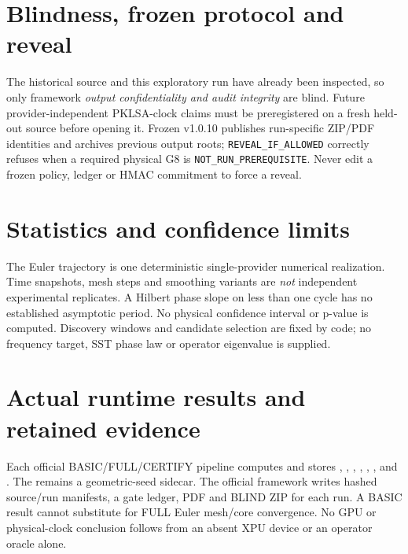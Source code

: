 \documentclass[11pt,a4paper]{article}
\begin{document}
\section{Blindness, frozen protocol and reveal}
The historical source and this exploratory run have already been inspected, so only framework \emph{output confidentiality and audit integrity} are blind. Future provider-independent PKLSA-clock claims must be preregistered on a fresh held-out source before opening it. Frozen v1.0.10 publishes run-specific ZIP/PDF identities and archives previous output roots; \texttt{REVEAL\_IF\_ALLOWED} correctly refuses when a required physical G8 is \texttt{NOT\_RUN\_PREREQUISITE}. Never edit a frozen policy, ledger or HMAC commitment to force a reveal.

\section{Statistics and confidence limits}
The Euler trajectory is one deterministic single-provider numerical realization. Time snapshots, mesh steps and smoothing variants are \emph{not} independent experimental replicates. A Hilbert phase slope on less than one cycle has no established asymptotic period. No physical confidence interval or p-value is computed. Discovery windows and candidate selection are fixed by code; no frequency target, SST phase law or operator eigenvalue is supplied.

\section{Actual runtime results and retained evidence}
Each official BASIC/FULL/CERTIFY pipeline computes and stores
,
,
,
,
,
, and
.
The  remains a geometric-seed sidecar. The official framework writes hashed source/run manifests, a gate ledger, PDF and BLIND ZIP for each run. A BASIC result cannot substitute for FULL Euler mesh/core convergence. No GPU or physical-clock conclusion follows from an absent XPU device or an operator oracle alone.

\end{document}
